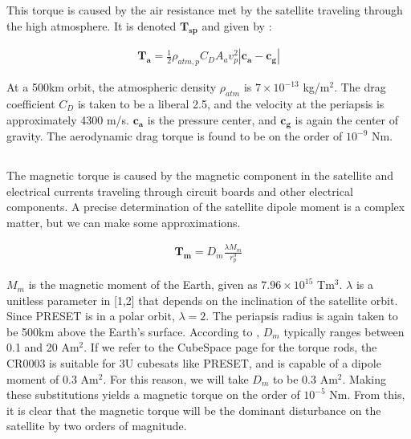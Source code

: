 \documentclass{article}
\begin{document}
This torque is caused by the air resistance met by the satellite traveling through the high atmosphere. It is denoted $\mathbf{T_{sp}}$ and given by \cite{nanostar}:

\begin{align}
    \mathbf{T_{a}} = \frac{1}{2} \rho_{atm,p} C_{D} A_{a} v_{p}^2 |\mathbf{c_{a}} - \mathbf{c_{g}}| \tag{2.3}
\end{align}

 At a 500km orbit, the atmospheric density $\rho_{atm}$ is $7 \times 10^{-13}$ kg/m$^2$. The drag coefficient $C_{D}$ is taken to be a liberal 2.5, and the velocity at the periapsis is approximately 4300 m/s. $\mathbf{c_{a}}$ is the pressure center, and $\mathbf{c_{g}}$ is again the center of gravity. The aerodynamic drag torque is found to be on the order of $10^{-9}$ Nm. 

\subsection{\color{black}{Magnetic Torque}}

The magnetic torque is caused by the magnetic component in the satellite and electrical currents traveling through circuit boards and other electrical components. A precise determination of the satellite dipole moment is a complex matter, but we can make some approximations.

\begin{align}
    \mathbf{T_{m}} = D_{m} \frac{\lambda M_{m}}{r_{p}^3} \tag{2.4}
\end{align}

 $M_{m}$ is the magnetic moment of the Earth, given as $7.96 \times 10^{15}$ Tm$^{3}$. $\lambda$ is a unitless parameter in [1,2] that depends on the inclination of the satellite orbit. Since PRESET is in a polar orbit, $\lambda=2$. The periapsis radius is again taken to be 500km above the Earth's surface. According to \cite{nanostar}, $D_{m}$ typically ranges between 0.1 and 20 Am$^2$. If we refer to the CubeSpace page for the torque rods, the CR0003 is suitable for 3U cubesats like PRESET, and is capable of a dipole moment of 0.3 Am$^2$. For this reason, we will take $D_{m}$ to be 0.3 Am$^2$. Making these substitutions yields a magnetic torque on the order of $10^{-5}$ Nm. From this, it is clear that the magnetic torque will be the dominant disturbance on the satellite by two orders of magnitude. 

\newpage

\section{\color{black}{Attitude Determination and Control Systems}}
\end{document}
